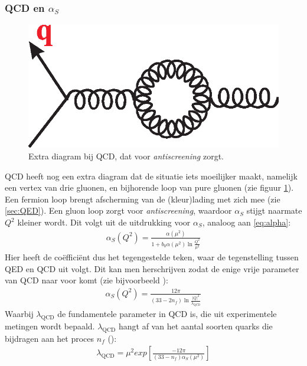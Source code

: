 \documentclass[a4paper,11pt]{article}
\numberwithin{equation}{section} %
\begin{document}
    \subsubsection{QCD en $\alpha_S$}
\begin{figure} [H]
  \begin{center}
    \includegraphics[scale=.33]{Afbeeldingen/GluonLoop.eps}
    \caption{Extra diagram bij QCD, dat voor \textit{antiscreening} zorgt. \cite{Martin}}
   \label{fig:GluonLoop}
  \end{center}
\end{figure}
QCD heeft nog een extra diagram dat de situatie iets moeilijker maakt, namelijk een vertex van drie gluonen, en bijhorende loop van pure gluonen (zie figuur \ref{fig:GluonLoop}).
Een fermion loop brengt afscherming van de (kleur)lading met zich mee (zie \ref{sec:QED}).
Een gluon loop zorgt voor \textit{antiscreening}, waardoor  $\alpha_S$ stijgt naarmate $Q^2$ kleiner wordt.
Dit volgt uit de uitdrukking voor $\alpha_S$, analoog aan \eqref{eq:alpha}:
\begin{align}
\alpha_S( Q^2 ) =\frac{\alpha(\mu^2)}{1+b_0 \alpha(\mu^2) \ln{\frac{Q^2}{\mu^2}}}
\end{align}
Hier heeft de coëfficiënt dus het tegengestelde teken, waar de tegenstelling tussen QED en QCD uit volgt.
Dit kan men herschrijven zodat de enige vrije parameter van QCD naar voor komt (zie bijvoorbeeld \cite[sectie 6.6]{Bettini}):
\begin{align} \label{eq:runningAlphaS}
\alpha_S(Q^2) = \frac{12\pi}{(33-2n_f) \ln{\frac{|Q|^2}{\lambda_\text{QCD}}}}
\end{align}
Waarbij $\lambda_\text{QCD}$ de fundamentele parameter in QCD is, die uit experimentele metingen wordt bepaald.
$\lambda_\text{QCD}$ hangt af van het aantal soorten quarks die bijdragen aan het proces $n_f$ (\cite[sectie 6.6]{Bettini}):
\begin{align}
\lambda_\text{QCD} = \mu^2 exp \left[ \frac{-12\pi}{(33-n_f) \alpha_S(\mu^2)} \right]
\end{align}
\end{document}
